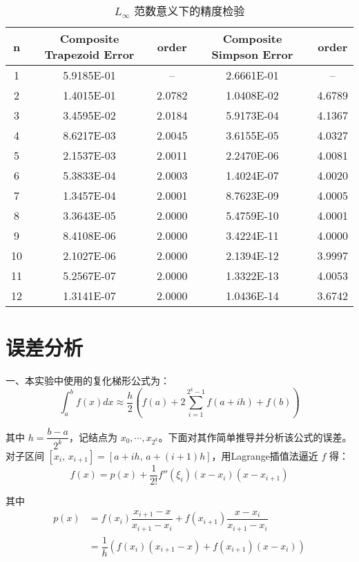 \documentclass{ctexart}
\begin{document}
\begin{table}[htb]
	\centering
	\bigskip
	\begin{small}
		\begin{tabular}{|c|cc|cc|}
			\hline
			n & Composite Trapezoid Error & order & Composite Simpson Error & order\\\hline
			1 & 5.9185E-01 & -- & 2.6661E-01 & --\\
			2 & 1.4015E-01 & 2.0782 & 1.0408E-02 & 4.6789\\
			3 & 3.4595E-02 & 2.0184 & 5.9173E-04 & 4.1367\\
			4 & 8.6217E-03 & 2.0045 & 3.6155E-05 & 4.0327\\
			5 & 2.1537E-03 & 2.0011 & 2.2470E-06 & 4.0081\\
			6 & 5.3833E-04 & 2.0003 & 1.4024E-07 & 4.0020\\
			7 & 1.3457E-04 & 2.0001 & 8.7623E-09 & 4.0005\\
			8 & 3.3643E-05 & 2.0000 & 5.4759E-10 & 4.0001\\
			9 & 8.4108E-06 & 2.0000 & 3.4224E-11 & 4.0000\\
			10 & 2.1027E-06 & 2.0000 & 2.1394E-12 & 3.9997\\
			11 & 5.2567E-07 & 2.0000 & 1.3322E-13 & 4.0053\\
			12 & 1.3141E-07 & 2.0000 & 1.0436E-14 & 3.6742\\\hline
		\end{tabular}
	\end{small}
	\caption{\label{table.label} $L_\infty$ 范数意义下的精度检验} 
\end{table}

\section*{误差分析}
	\noindent 一、本实验中使用的复化梯形公式为：
	\begin{equation}
		\int_a^b f(x)dx \approx \dfrac{h}{2}\left(f(a) + 2\sum_{i = 1}^{2^k - 1} f(a + ih) + f(b)\right)
	\end{equation}
	
	其中 $h = \dfrac{b - a}{2^k}$，记结点为 $x_0, \cdots, x_{2^k}$。下面对其作简单推导并分析该公式的误差。对子区间 $[x_{i},\,x_{i+1}] = [a + ih,\, a + (i+1)h]$，用Lagrange插值法逼近 $f$ 得：
	\begin{equation}
			f(x) = p(x) + \dfrac{1}{2!}f''(\xi_i)(x - x_{i})(x - x_{i+1})
	\end{equation}
	
	其中 
	\begin{align}
		p(x) & = f(x_i)\dfrac{x_{i+1} - x}{x_{i+1} - x_{i}} + f(x_{i+1})\dfrac{x - x_{i}}{x_{i+1} - x_{i}}\\
		& = \dfrac{1}{h}\left(f(x_i)(x_{i+1} - x) + f(x_{i+1})(x - x_{i})\right)
	\end{align}
	
\end{document}
